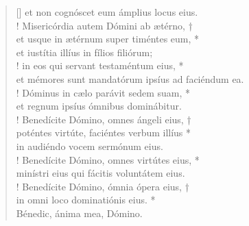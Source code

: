 \begin{verse}[\versewidth]
\vin et non cognóscet eum ámplius locus eius.\\!
Misericórdia autem Dómini ab ætérno, †\\
et usque in ætérnum super timéntes eum, *\\
et iustítia illíus in fílios filiórum;\\!
\vin in eos qui servant testaméntum eius, *\\
\vin et mémores sunt mandatórum ipsíus ad faciéndum ea.\\!
Dóminus in cælo parávit sedem suam, *\\
et regnum ipsíus ómnibus dominábitur.\\!
\vin Benedícite Dómino, omnes ángeli eius, †\\
\vin poténtes virtúte, faciéntes verbum illíus *\\
\vin in audiéndo vocem sermónum eius.\\!
Benedícite Dómino, omnes virtútes eius, *\\
minístri eius qui fácitis voluntátem eius.\\!
\vin Benedícite Dómino, ómnia ópera eius, †\\
\vin in omni loco dominatiónis eius. *\\
\vin Bénedic, ánima mea, Dómino.\\
\end{verse}
\vspace{1cm}


